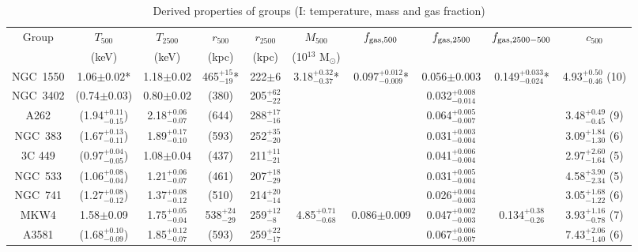 \documentclass{aastex}
\begin{document}
\begin{table}
\begin{center}
\caption{Derived properties of groups (I: temperature, mass and gas fraction)}
\vspace{0.3cm}
{\tiny
\begin{tabular}{cccccccccc} \hline \hline
Group & $T_{500}$\tablenotemark{a} & $T_{2500}$ & $r_{500}$\tablenotemark{a} & $r_{2500}$ & $M_{500}$\tablenotemark{a} & $f_{\rm gas, 500}$\tablenotemark{a} & $f_{\rm gas, 2500}$ & $f_{\rm gas, 2500-500}$\tablenotemark{a} & $c_{500}$\tablenotemark{b} \\
      & (keV) & (keV) & (kpc) & (kpc) & (10$^{13}$ M$_{\odot}$) & & & & \\ \hline

NGC~1550 & 1.06$\pm0.02$* & 1.18$\pm0.02$ & 465$^{+15}_{-19}$* & 222$\pm6$ & 3.18$^{+0.32}_{-0.37}$* & 0.097$^{+0.012}_{-0.009}$* & 0.056$\pm$0.003 & 0.149$^{+0.033}_{-0.024}$* & 4.93$^{+0.50}_{-0.46}$ (10) \\
NGC~3402 & (0.74$\pm0.03$)& 0.80$\pm0.02$ & (380) & 205$^{+62}_{-22}$ & & & 0.032$^{+0.008}_{-0.014}$ & & \\
A262     & (1.94$^{+0.11}_{-0.15}$) & 2.18$^{+0.06}_{-0.07}$ & (644) & 288$^{+17}_{-16}$ & & & 0.064$^{+0.005}_{-0.007}$ & & 3.48$^{+0.49}_{-0.45}$ (9) \\
NGC~383  & (1.67$^{+0.13}_{-0.11}$) & 1.89$^{+0.17}_{-0.10}$ & (593) & 252$^{+35}_{-20}$ & & & 0.031$^{+0.003}_{-0.004}$ & & 3.09$^{+1.84}_{-1.30}$ (6) \\
3C 449   & (0.97$^{+0.04}_{-0.05}$) & 1.08$\pm0.04$ & (437) & 211$^{+11}_{-21}$ & & & 0.041$^{+0.006}_{-0.004}$ & & 2.97$^{+2.60}_{-1.64}$ (5) \\
NGC~533  & (1.06$^{+0.08}_{-0.04}$) & 1.21$^{+0.06}_{-0.07}$ & (461) & 207$^{+18}_{-29}$ & & & 0.031$^{+0.005}_{-0.004}$ & & 4.58$^{+3.90}_{-2.34}$ (5) \\
NGC~741  & (1.27$^{+0.08}_{-0.12}$) & 1.37$^{+0.08}_{-0.12}$ & (510) & 214$^{+20}_{-14}$ & & & 0.026$^{+0.004}_{-0.003}$ & & 3.05$^{+1.68}_{-1.22}$ (6) \\
MKW4     & 1.58$\pm$0.09 & 1.75$^{+0.05}_{-0.04}$ & 538$^{+24}_{-29}$ & 259$^{+12}_{-8}$ & 4.85$^{+0.71}_{-0.68}$ & 0.086$\pm$0.009 & 0.047$^{+0.002}_{-0.003}$ & 0.134$^{+0.38}_{-0.26}$ & 3.93$^{+1.16}_{-0.78}$ (7) \\
A3581    & (1.68$^{+0.10}_{-0.09}$) & 1.85$^{+0.12}_{-0.07}$ & (593) & 259$^{+22}_{-17}$ & & & 0.067$^{+0.006}_{-0.007}$ & & 7.43$^{+2.06}_{-1.40}$ (6) \\

\end{tabular}}
\end{center}
\end{table}
\end{document}
